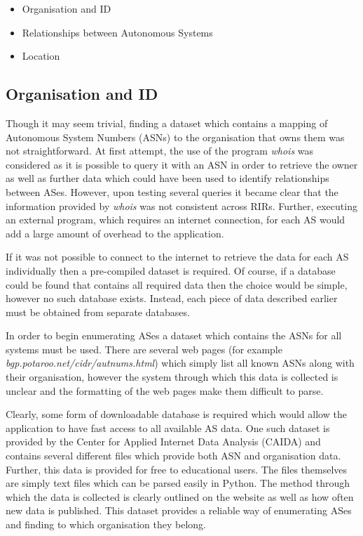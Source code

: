 \begin{itemize}
	\item{Organisation and ID}
	\item{Relationships between Autonomous Systems}
	\item{Location}
\end{itemize}

\subsection{Organisation and ID}
Though it may seem trivial, finding a dataset which contains a mapping of Autonomous System Numbers (ASNs) to the organisation that owns them was not straightforward. At first attempt, the use of the program \textit{whois} was considered as it is possible to query it with an ASN in order to retrieve the owner as well as further data which could have been used to identify relationships between ASes. However, upon testing several queries it became clear that the information provided by \textit{whois} was not consistent across RIRs. Further, executing an external program, which requires an internet connection, for each AS would add a large amount of overhead to the application. 

If it was not possible to connect to the internet to retrieve the data for each AS individually then a pre-compiled dataset is required. Of course, if a database could be found that contains all required data then the choice would be simple, however no such database exists. Instead, each piece of data described earlier must be obtained from separate databases. 

In order to begin enumerating ASes a dataset which contains the ASNs for all systems must be used. There are several web pages (for example \textit{bgp.potaroo.net/cidr/autnums.html}) which simply list all known ASNs along with their organisation, however the system through which this data is collected is unclear and the formatting of the web pages make them difficult to parse. 

Clearly, some form of downloadable database is required which would allow the application to have fast access to all available AS data. One such dataset is provided by the Center for Applied Internet Data Analysis (CAIDA) and contains several different files which provide both ASN and organisation data. Further, this data is provided for free to educational users. The files themselves are simply text files which can be parsed easily in Python. The method through which the data is collected is clearly outlined on the website as well as how often new data is published. This dataset provides a reliable way of enumerating ASes and finding to which organisation they belong.

